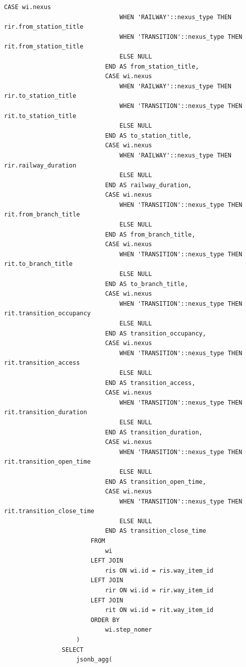 \begin{lstlisting}[label=lst:get_route_json_by_id:4,caption=Реализация функции получения маршрута (часть 4),firstnumber=147]
                            CASE wi.nexus
                                WHEN 'RAILWAY'::nexus_type THEN rir.from_station_title
                                WHEN 'TRANSITION'::nexus_type THEN rit.from_station_title
                                ELSE NULL
                            END AS from_station_title,
                            CASE wi.nexus
                                WHEN 'RAILWAY'::nexus_type THEN rir.to_station_title
                                WHEN 'TRANSITION'::nexus_type THEN rit.to_station_title
                                ELSE NULL
                            END AS to_station_title,
                            CASE wi.nexus
                                WHEN 'RAILWAY'::nexus_type THEN rir.railway_duration
                                ELSE NULL
                            END AS railway_duration,
                            CASE wi.nexus
                                WHEN 'TRANSITION'::nexus_type THEN rit.from_branch_title
                                ELSE NULL
                            END AS from_branch_title,
                            CASE wi.nexus
                                WHEN 'TRANSITION'::nexus_type THEN rit.to_branch_title
                                ELSE NULL
                            END AS to_branch_title,
                            CASE wi.nexus
                                WHEN 'TRANSITION'::nexus_type THEN rit.transition_occupancy
                                ELSE NULL
                            END AS transition_occupancy,
                            CASE wi.nexus
                                WHEN 'TRANSITION'::nexus_type THEN rit.transition_access
                                ELSE NULL
                            END AS transition_access,
                            CASE wi.nexus
                                WHEN 'TRANSITION'::nexus_type THEN rit.transition_duration
                                ELSE NULL
                            END AS transition_duration,
                            CASE wi.nexus
                                WHEN 'TRANSITION'::nexus_type THEN rit.transition_open_time
                                ELSE NULL
                            END AS transition_open_time,
                            CASE wi.nexus
                                WHEN 'TRANSITION'::nexus_type THEN rit.transition_close_time
                                ELSE NULL
                            END AS transition_close_time
                        FROM
                            wi
                        LEFT JOIN
                            ris ON wi.id = ris.way_item_id
                        LEFT JOIN
                            rir ON wi.id = rir.way_item_id
                        LEFT JOIN
                            rit ON wi.id = rit.way_item_id
                        ORDER BY
                            wi.step_nomer
                    )
                SELECT
                    jsonb_agg(
\end{lstlisting}

